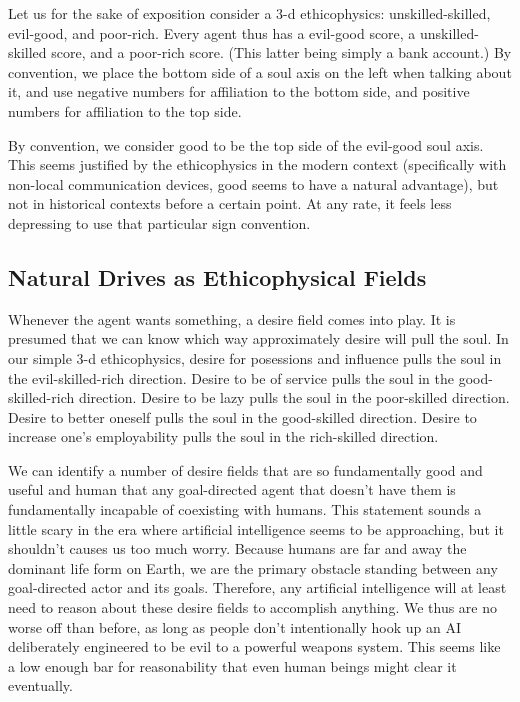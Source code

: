\documentclass{article}
\begin{document}
Let us for the sake of exposition consider a 3-d ethicophysics:
unskilled-skilled, evil-good, and poor-rich. Every agent thus has a
evil-good score, a unskilled-skilled score, and a poor-rich
score. (This latter being simply a bank account.) By convention, we
place the bottom side of a soul axis on the left when talking about
it, and use negative numbers for affiliation to the bottom side, and
positive numbers for affiliation to the top side.

By convention, we consider good to be the top side of the evil-good
soul axis. This seems justified by the ethicophysics in the modern
context (specifically with non-local communication devices, good seems
to have a natural advantage), but not in historical contexts before a
certain point. At any rate, it feels less depressing to use that
particular sign convention.

\subsection{Natural Drives as Ethicophysical Fields}

Whenever the agent wants something, a desire field comes into play. It
is presumed that we can know which way approximately desire will pull
the soul. In our simple 3-d ethicophysics, desire for posessions and
influence pulls the soul in the evil-skilled-rich direction. Desire to
be of service pulls the soul in the good-skilled-rich
direction. Desire to be lazy pulls the soul in the poor-skilled
direction.  Desire to better oneself pulls the soul in the
good-skilled direction. Desire to increase one's employability pulls
the soul in the rich-skilled direction. 

We can identify a number of desire fields that are so fundamentally
good and useful and human that any goal-directed agent that doesn't
have them is fundamentally incapable of coexisting with humans. This
statement sounds a little scary in the era where artificial
intelligence seems to be approaching, but it shouldn't causes us too
much worry. Because humans are far and away the dominant life form on
Earth, we are the primary obstacle standing between any goal-directed
actor and its goals. Therefore, any artificial intelligence will at
least need to reason about these desire fields to accomplish
anything. We thus are no worse off than before, as long as people
don't intentionally hook up an AI deliberately engineered to be evil
to a powerful weapons system. This seems like a low enough bar for
reasonability that even human beings might clear it eventually.
\end{document}
